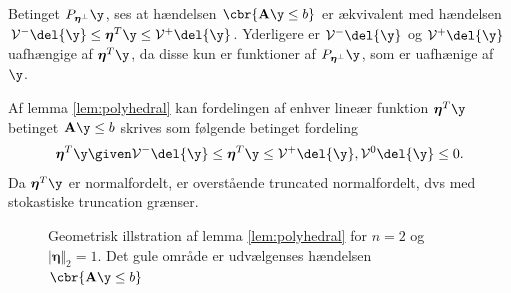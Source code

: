 Betinget \(P_{\boldsymbol{\eta}^\perp} \y\), ses at hændelsen \(\cbr{\mathbf{A} \y \leq b}\) er ækvivalent med hændelsen \(\mathcal{V}^- \del{\y} \leq \boldsymbol{\eta}^T \y \leq \mathcal{V}^+ \del{\y}\). Yderligere er \(\mathcal{V}^- \del{\y}\) og \(\mathcal{V}^+ \del{\y}\) uafhængige af \(\boldsymbol{\eta}^T \y\), da disse kun er funktioner af \(P_{\boldsymbol{\eta}^\perp} \y\), som er uafhænige af \(\y\).


Af lemma \ref{lem:polyhedral} kan fordelingen af enhver lineær funktion \(\boldsymbol{\eta}^T \y\) betinget \(\mathbf{A} \y \leq b\) skrives som følgende betinget fordeling
\begin{align*}
\boldsymbol{\eta}^T \y \given \mathcal{V}^- \del{\y} \leq \boldsymbol{\eta}^T \y \leq \mathcal{V}^+ \del{\y}, \mathcal{V}^0 \del{\y} \leq 0.
\end{align*}
Da \(\boldsymbol{\eta}^T \y\) er normalfordelt, er overstående truncated normalfordelt, dvs med stokastiske truncation grænser.

\begin{figure}[H]
\centering
\caption{Geometrisk illstration af lemma \ref{lem:polyhedral} for \(n=2\) og \(\vert \boldsymbol{\eta} \Vert_2=1\). 
Det gule område er udvælgenses hændelsen \(\cbr{\mathbf{A} \y \leq b}\)}
\end{figure}


